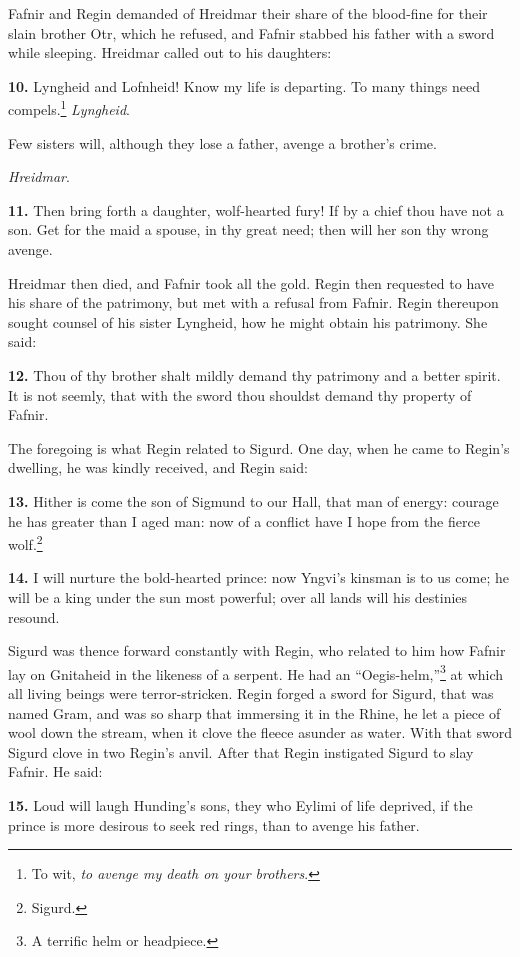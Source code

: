 Fafnir and Regin demanded of Hreidmar their share of the blood-fine
for their slain brother Otr, which he refused, and Fafnir stabbed his
father with a sword while sleeping. Hreidmar called out to his
daughters:

\textbf{10.} Lyngheid and Lofnheid! Know my life is departing. To many things
need compels.\footnote{To wit, \emph{to avenge my death on your brothers}.} \emph{Lyngheid}.

Few sisters will, although they lose a father, avenge a brother's
crime.

\emph{Hreidmar}.

\textbf{11.} Then bring forth a daughter, wolf-hearted fury! If by a chief
thou have not a son. Get for the maid a spouse, in thy great need;
then will her son thy wrong avenge.

Hreidmar then died, and Fafnir took all the gold. Regin then requested
to have his share of the patrimony, but met with a refusal from
Fafnir. Regin thereupon sought counsel of his sister Lyngheid, how he
might obtain his patrimony. She said:

\textbf{12.} Thou of thy brother shalt mildly demand thy patrimony and a
better spirit. It is not seemly, that with the sword thou shouldst
demand thy property of Fafnir.

The foregoing is what Regin related to Sigurd. One day, when he came
to Regin's dwelling, he was kindly received, and Regin said:

\textbf{13.} Hither is come the son of Sigmund to our Hall, that man of
energy: courage he has greater than I aged man: now of a conflict have
I hope from the fierce wolf.\footnote{Sigurd.}

\textbf{14.} I will nurture the bold-hearted prince: now Yngvi's kinsman is
to us come; he will be a king under the sun most powerful; over all
lands will his destinies resound.

Sigurd was thence forward constantly with Regin, who related to him
how Fafnir lay on Gnitaheid in the likeness of a serpent. He had an
``Oegis-helm,''\footnote{A terrific helm or headpiece.} at which all living beings were terror-stricken.
Regin forged a sword for Sigurd, that was named Gram, and was so sharp
that immersing it in the Rhine, he let a piece of wool down the
stream, when it clove the fleece asunder as water. With that sword
Sigurd clove in two Regin's anvil. After that Regin instigated Sigurd
to slay Fafnir. He said:

\textbf{15.} Loud will laugh Hunding's sons, they who Eylimi of life
deprived, if the prince is more desirous to seek red rings, than to
avenge his father.

